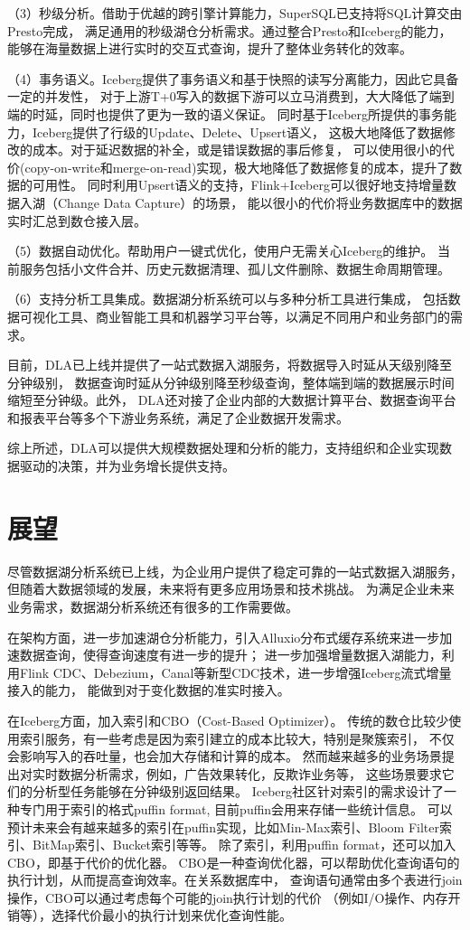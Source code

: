 （3）秒级分析。借助于优越的跨引擎计算能力，SuperSQL已支持将SQL计算交由Presto完成，
满足通用的秒级湖仓分析需求。通过整合Presto和Iceberg的能力，能够在海量数据上进行实时的交互式查询，提升了整体业务转化的效率。

（4）事务语义。Iceberg提供了事务语义和基于快照的读写分离能力，因此它具备一定的并发性，
对于上游T+0写入的数据下游可以立马消费到，大大降低了端到端的时延，同时也提供了更为一致的语义保证。
同时基于Iceberg所提供的事务能力，Iceberg提供了行级的Update、Delete、Upsert语义，
这极大地降低了数据修改的成本。对于延迟数据的补全，或是错误数据的事后修复，
可以使用很小的代价(copy-on-write和merge-on-read)实现，极大地降低了数据修复的成本，提升了数据的可用性。
同时利用Upsert语义的支持，Flink+Iceberg可以很好地支持增量数据入湖（Change Data Capture）的场景，
能以很小的代价将业务数据库中的数据实时汇总到数仓接入层。

（5）数据自动优化。帮助用户一键式优化，使用户无需关心Iceberg的维护。
当前服务包括小文件合并、历史元数据清理、孤儿文件删除、数据生命周期管理。

（6）支持分析工具集成。数据湖分析系统可以与多种分析工具进行集成，
包括数据可视化工具、商业智能工具和机器学习平台等，以满足不同用户和业务部门的需求。

目前，DLA已上线并提供了一站式数据入湖服务，将数据导入时延从天级别降至分钟级别，
数据查询时延从分钟级别降至秒级查询，整体端到端的数据展示时间缩短至分钟级。此外，
DLA还对接了企业内部的大数据计算平台、数据查询平台和报表平台等多个下游业务系统，满足了企业数据开发需求。

综上所述，DLA可以提供大规模数据处理和分析的能力，支持组织和企业实现数据驱动的决策，并为业务增长提供支持。

\section{展望}

尽管数据湖分析系统已上线，为企业用户提供了稳定可靠的一站式数据入湖服务，
但随着大数据领域的发展，未来将有更多应用场景和技术挑战。
为满足企业未来业务需求，数据湖分析系统还有很多的工作需要做。

在架构方面，进一步加速湖仓分析能力，引入Alluxio分布式缓存系统来进一步加速数据查询，使得查询速度有进一步的提升；
进一步加强增量数据入湖能力，利用Flink CDC、Debezium，Canal等新型CDC技术，进一步增强Iceberg流式增量接入的能力，
能做到对于变化数据的准实时接入。

在Iceberg方面，加入索引和CBO（Cost-Based Optimizer）。
传统的数仓比较少使用索引服务，有一些考虑是因为索引建立的成本比较大，特别是聚簇索引，
不仅会影响写入的吞吐量，也会加大存储和计算的成本。
然而越来越多的业务场景提出对实时数据分析需求，例如，广告效果转化，反欺诈业务等，
这些场景要求它们的分析型任务能够在分钟级别返回结果。
Iceberg社区针对索引的需求设计了一种专门用于索引的格式puffin format, 目前puffin会用来存储一些统计信息。
可以预计未来会有越来越多的索引在puffin实现，比如Min-Max索引、Bloom Filter索引、BitMap索引、Bucket索引等等。
除了索引，利用puffin format，还可以加入CBO，即基于代价的优化器。
CBO是一种查询优化器，可以帮助优化查询语句的执行计划，从而提高查询效率。在关系数据库中，
查询语句通常由多个表进行join操作，CBO可以通过考虑每个可能的join执行计划的代价
（例如I/O操作、内存开销等），选择代价最小的执行计划来优化查询性能。

